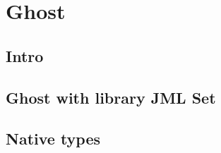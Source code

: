 \section{Ghost}
\subsection{Intro}
\subsection{Ghost with library JML Set}
\subsection{Native types}